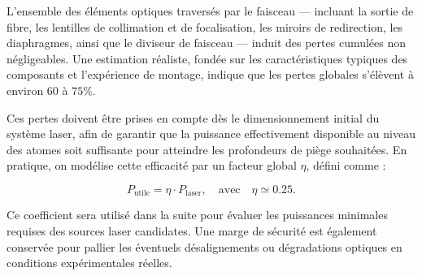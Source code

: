 L’ensemble des éléments optiques traversés par le faisceau — incluant la sortie de fibre, les lentilles de collimation et de focalisation, les miroirs de redirection, les diaphragmes, ainsi que le diviseur de faisceau — induit des pertes cumulées non négligeables. Une estimation réaliste, fondée sur les caractéristiques typiques des composants et l'expérience de montage, indique que les pertes globales s’élèvent à environ $60$ à $75\%$.

Ces pertes doivent être prises en compte dès le dimensionnement initial du système laser, afin de garantir que la puissance effectivement disponible au niveau des atomes soit suffisante pour atteindre les profondeurs de piège souhaitées. En pratique, on modélise cette efficacité par un facteur global $\eta$, défini comme :

\[
P_{\text{utile}} = \eta \cdot P_{\text{laser}}, \quad \text{avec} \quad \eta \simeq 0.25.
\]

Ce coefficient sera utilisé dans la suite pour évaluer les puissances minimales requises des sources laser candidates. Une marge de sécurité est également conservée pour pallier les éventuels désalignements ou dégradations optiques en conditions expérimentales réelles.

